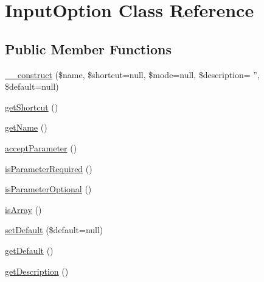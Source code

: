 \hypertarget{class_symfony_1_1_components_1_1_console_1_1_input_1_1_input_option}{
\section{InputOption Class Reference}
\label{class_symfony_1_1_components_1_1_console_1_1_input_1_1_input_option}
}
\subsection*{Public Member Functions}
\begin{DoxyCompactItemize}
\item 
\hyperlink{class_symfony_1_1_components_1_1_console_1_1_input_1_1_input_option_a5fb56d3063420a7b81d41ffe60f6fc3e}{\_\-\_\-construct} (\$name, \$shortcut=null, \$mode=null, \$description= '', \$default=null)
\item 
\hyperlink{class_symfony_1_1_components_1_1_console_1_1_input_1_1_input_option_a1bdfaff62e3e5f5962c0d01865cae614}{getShortcut} ()
\item 
\hyperlink{class_symfony_1_1_components_1_1_console_1_1_input_1_1_input_option_a3d0963e68bb313b163a73f2803c64600}{getName} ()
\item 
\hyperlink{class_symfony_1_1_components_1_1_console_1_1_input_1_1_input_option_a4f7926a0290495293a0572d80bbe17f5}{acceptParameter} ()
\item 
\hyperlink{class_symfony_1_1_components_1_1_console_1_1_input_1_1_input_option_ad01d8e86ff27ba7d11782abd2f192a97}{isParameterRequired} ()
\item 
\hyperlink{class_symfony_1_1_components_1_1_console_1_1_input_1_1_input_option_a4f5e217cd6fd25504010538b57471ae3}{isParameterOptional} ()
\item 
\hyperlink{class_symfony_1_1_components_1_1_console_1_1_input_1_1_input_option_a2f0ab131ec6fa3f6f91721eb72ca10f0}{isArray} ()
\item 
\hyperlink{class_symfony_1_1_components_1_1_console_1_1_input_1_1_input_option_aae7b38e461eb4bb55b0fc924ca924201}{setDefault} (\$default=null)
\item 
\hyperlink{class_symfony_1_1_components_1_1_console_1_1_input_1_1_input_option_adc30a2a4d3e48cb6aee21562afbc4022}{getDefault} ()
\item 
\hyperlink{class_symfony_1_1_components_1_1_console_1_1_input_1_1_input_option_a2e7bb35c71bf1824456ceb944cb7a845}{getDescription} ()
\end{DoxyCompactItemize}
